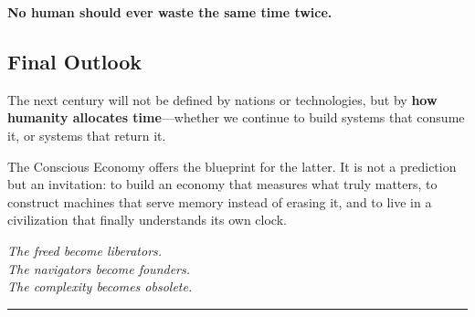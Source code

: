 \begin{fundamentallaw}
\textbf{No human should ever waste the same time twice.}
\end{fundamentallaw}

\subsection{Final Outlook}
\label{sec:final-outlook}

The next century will not be defined by nations or technologies, but by \textbf{how humanity allocates time}—whether we continue to build systems that consume it, or systems that return it.

The Conscious Economy offers the blueprint for the latter. It is not a prediction but an invitation: to build an economy that measures what truly matters, to construct machines that serve memory instead of erasing it, and to live in a civilization that finally understands its own clock.

\vspace{1em}

\begin{center}
\textit{\large The freed become liberators.}\\
\textit{\large The navigators become founders.}\\
\textit{\large The complexity becomes obsolete.}
\end{center}

\vspace{1em}

\begin{center}
\rule{0.5\textwidth}{0.4pt}
\end{center}
